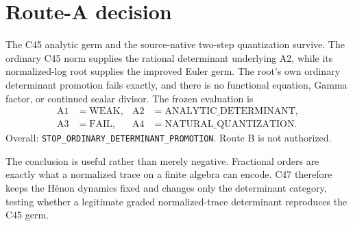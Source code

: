 \section{Route-A decision}

The C45 analytic germ and the source-native two-step quantization survive.
The ordinary C45 norm supplies the rational determinant underlying A2, while
its normalized-log root supplies the improved Euler germ.  The root's own
ordinary determinant promotion fails exactly, and there is no functional
equation, Gamma factor, or continued scalar divisor.  The frozen evaluation is
\begin{align*}
 \mathrm{A1}&=\mathrm{WEAK},
 &\mathrm{A2}&=\mathrm{ANALYTIC\_DETERMINANT},\\
 \mathrm{A3}&=\mathrm{FAIL},
 &\mathrm{A4}&=\mathrm{NATURAL\_QUANTIZATION}.
\end{align*}
Overall: \texttt{STOP\_ORDINARY\_DETERMINANT\_PROMOTION}.  Route B is not
authorized.

The conclusion is useful rather than merely negative.  Fractional orders are
exactly what a normalized trace on a finite algebra can encode.  C47 therefore
keeps the H\'enon dynamics fixed and changes only the determinant category,
testing whether a legitimate graded normalized-trace determinant reproduces
the C45 germ.
